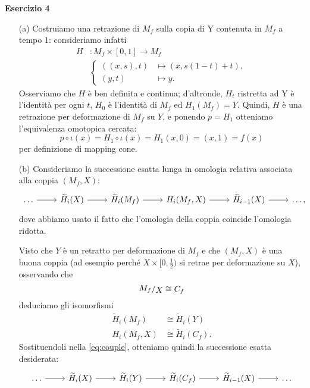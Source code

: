 \documentclass[a4paper]{article}
\newcommand{\ssfrac}[2]{
	\raisebox{+0.3ex}{$#1$}
	/
	\raisebox{-0.3ex}{$#2$}
}
\theoremstyle{definition}
\theoremstyle{definition}
\theoremstyle{remark}
\theoremstyle{definition}
\begin{document}
\textbf{Esercizio 4}
\begin{itemize}
    \item[(a)] Costruiamo una retrazione di $M_f$ sulla copia di Y contenuta in $M_f$ a tempo $1$: consideriamo infatti
        \begin{align*}
            H & : M_f \times [0,1]  \to M_f          \\
              & \begin{cases}
                    ((x,s),t) & \mapsto (x, s(1-t) + t), \\
                    (y,t)     & \mapsto y.
                \end{cases}
        \end{align*}
        Osserviamo che $H$ è ben definita e continua; d'altronde, $H_t$ ristretta ad Y è l'identità per ogni $t$, $H_0$ è l'identità di $M_f$ ed $H_1(M_f)=Y$. Quindi, $H$ è una retrazione per deformazione di $M_f$ su $Y$, e ponendo $p=H_1$ otteniamo l'equivalenza omotopica cercata:
        \[
            p\circ \iota (x) = H_1\circ \iota (x) = H_1(x,0) = (x,1) = f(x)
        \]
        per definizione di mapping cone.

    \item[(b)] Consideriamo la successione esatta lunga in omologia relativa associata alla coppia $(M_f, X)$:
        \begin{equation}\label{eq:couple}
            \begin{tikzcd}
                \dots \arrow[r] & \widetilde{H}_i(X) \arrow[r] & \widetilde{H}_i(M_f) \arrow[r] & H_i(M_f, X) \arrow[r] & \widetilde{H}_{i-1}(X) \arrow[r] & \dots,
            \end{tikzcd}
        \end{equation}
        dove abbiamo usato il fatto che l'omologia della coppia coincide l'omologia ridotta.

        Visto che $Y$ è un retratto per deformazione di $M_f$ e che $(M_f, X)$ è una buona coppia (ad esempio perché $X\times [0,\frac{1}{2})$ si retrae per deformazione su $X$),
        osservando che
        \[
            \ssfrac{M_f}{X} \cong C_f
        \]
        deduciamo gli isomorfismi
        \begin{align*}
            \widetilde{H}_i(M_f) & \cong  \widetilde{H}_i(Y)   \\
            H_i(M_f, X)          & \cong \widetilde{H}_i(C_f).
        \end{align*}
        Sostituendoli nella \eqref{eq:couple}, otteniamo quindi la successione esatta desiderata:
        \[
            \begin{tikzcd}
                \dots \arrow[r] & \widetilde{H}_i(X) \arrow[r] & \widetilde{H}_i(Y) \arrow[r] & \widetilde{H}_i(C_f) \arrow[r] & \widetilde{H}_{i-1}(X) \arrow[r] & \dots
            \end{tikzcd}
        \]
\end{itemize}
\end{document}
